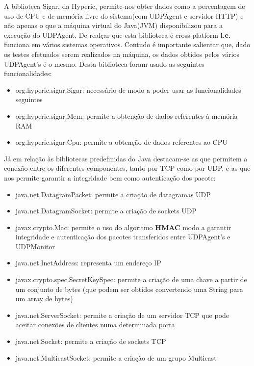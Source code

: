 \documentclass{article}
\begin{document}
A biblioteca Sigar, da Hyperic, permite-nos obter dados como a percentagem de uso de CPU e de memória livre do sistema(com UDPAgent e servidor HTTP) e não apenas o que a máquina virtual do Java(JVM) disponibilizou para a execução do UDPAgent. De realçar que esta biblioteca é cross-platform \textbf{i.e.} funciona em vários sistemas operativos. Contudo é importante salientar que, dado os testes efetuados serem realizados na máquina, os dados obtidos pelos vários UDPAgent's é o mesmo. Desta biblioteca foram usado as seguintes funcionalidades:
\begin{itemize}
	\item org.hyperic.sigar.Sigar: necessário de modo a poder usar as funcionalidades seguintes
	\item org.hyperic.sigar.Mem: permite a obtenção de dados referentes à memória RAM
	\item org.hyperic.sigar.Cpu: permite a obtenção de dados referentes ao CPU
\end{itemize}
Já em relação às bibliotecas predefinidas do Java destacam-se as que permitem a conexão entre os diferentes componentes, tanto por TCP como por UDP, e as que nos permite garantir a integridade bem como autenticação dos pacote:
\begin{itemize}
	\item java.net.DatagramPacket: permite a criação de datagramas UDP
  	\item java.net.DatagramSocket: permite a criação de sockets UDP
    \item javax.crypto.Mac: permite o uso do algoritmo \textbf{HMAC} modo a garantir integridade e autenticação dos pacotes transferidos entre UDPAgent's e UDPMonitor
    \item java.net.InetAddress: representa um endereço IP
    \item javax.crypto.spec.SecretKeySpec: permite a criação de uma chave a partir de um conjunto de bytes (que podem ser obtidos convertendo uma String para um array de bytes)
    \item java.net.ServerSocket: permite a criação de um servidor TCP que pode aceitar conexões de clientes numa determinada porta
	\item java.net.Socket: permite a criação de sockets TCP
    \item java.net.MulticastSocket: permite a criação de um grupo Multicast
\end{itemize}
\end{document}

